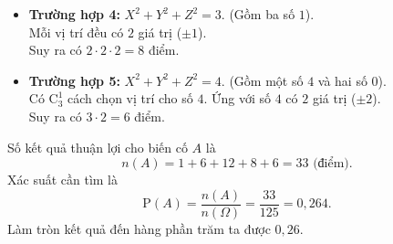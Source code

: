 \begin{ex}
{\begin{itemize}
			Suy ra có $3 \cdot 2 \cdot 2 = 12$ điểm.
			\item \textbf{Trường hợp 4:} $X^2 + Y^2 + Z^2 = 3$. (Gồm ba số $1$).\\
			Mỗi vị trí đều có $2$ giá trị ($\pm 1$).\\
			Suy ra có $2 \cdot 2 \cdot 2 = 8$ điểm.
			\item \textbf{Trường hợp 5:} $X^2 + Y^2 + Z^2 = 4$. (Gồm một số $4$ và hai số $0$).\\
			Có $\mathrm{C}_3^1$ cách chọn vị trí cho số $4$. Ứng với số $4$ có $2$ giá trị ($\pm 2$).\\
			Suy ra có $3 \cdot 2 = 6$ điểm.
		\end{itemize}
		Số kết quả thuận lợi cho biến cố $A$ là
		\[ n(A) = 1 + 6 + 12 + 8 + 6 = 33 \text{ (điểm).} \]
		Xác suất cần tìm là
		\[ \mathrm{P}(A) = \dfrac{n(A)}{n(\Omega)} = \dfrac{33}{125} = 0{,}264. \]
		Làm tròn kết quả đến hàng phần trăm ta được $0{,}26$.
	}
\end{ex}
